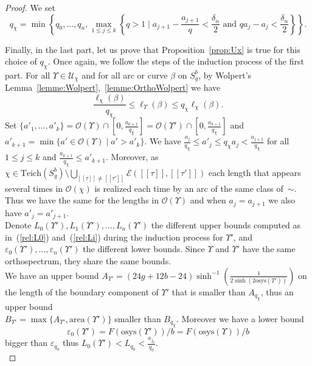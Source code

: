 \documentclass[a4paper,12pt]{article}
\theoremstyle{definition}
\theoremstyle{remark}
\begin{document}
\begin{proof}
    We set 
    \[
        q_\chi=\min \left\{q_0,...,q_n,\max_{1\leqslant j \leqslant k}\left\{q>1 \mid a_{j+1}-\frac{a_{j+1}}{q}< \frac{\delta_n}{2} \mbox{ and } qa_j - a_j < \frac{\delta_n}{2}  \right\} \right\}.
    \] 
    
    Finally, in the last part, let us prove that Proposition~\ref{prop:Ux} is true for this choice of $q_\chi$. Once again, we follow the steps of the induction process of the first part. For all $\Upsilon \in \mathcal{U}_\chi$ and for all arc or curve $\beta$ on $S_g^b$, by Wolpert's Lemma~\ref{lemme:Wolpert},~\ref{lemme:OrthoWolpert} we have
    \[
        \frac{\ell_\chi(\beta)}{q_\chi} \leqslant \ell_\Upsilon(\beta) \leqslant q_\chi \ell_\chi(\beta).    
    \]
    Set $\{a'_1,...,a'_k\}=\mathcal{O}(\Upsilon)\cap [0,\frac{a_{k+1}}{q_\chi}]=\mathcal{O}(\Upsilon')\cap [0,\frac{a_{k+1}}{q_\chi}]$ and $a'_{k+1}=\min\{ a' \in \mathcal{O}(\Upsilon) \mid a' > a'_k \}$. 
    We have $\frac{a_j}{q_\chi} \leqslant a'_j \leqslant q_\chi a_j < \frac{a_{j+1}}{q_\chi}$ for all $1 \leqslant j \leqslant k$ and $\frac{a_{k+1}}{q_\chi} \leqslant a'_{k+1}$. Moreover, as $\chi \in \mathrm{Teich}(S_g^b) \setminus \bigcup_{[[\tau]]\neq [[\tau']]} \mathcal{E}([[\tau]],[[\tau']])$ each length that appears several times in $\mathcal{O}(\chi)$ is realized each time by an arc of the same class of~$\sim$. Thus we have the same for the lengths in $\mathcal{O}(\Upsilon)$ and when $a_j=a_{j+1}$ we also have $a'_j=a'_{j+1}$.\\
    
    Denote $L_{0}(\Upsilon'), L_{1}(\Upsilon'),...,L_{n}(\Upsilon')$ the different upper bounds computed as in~(\ref{rel:L0}) and~(\ref{rel:Li}) during the induction process for $\Upsilon'$, and $\varepsilon_{0}(\Upsilon'),...,\varepsilon_{n}(\Upsilon')$ the different lower bounds. Since $\Upsilon$ and $\Upsilon'$ have the same orthospectrum, they share the same bounds. \\
    We have an upper bound $A_{\Upsilon'} = (24g+12b-24) \sinh^{-1}\left( \frac{1}{2\sinh(2 \mathrm{osys}(\Upsilon'))} \right)$ on the length of the boundary component of $\Upsilon'$ that is smaller than $A_{q_\chi}$, thus an upper bound \\
    $B_{\Upsilon'}=\max\{ A_{\Upsilon'}, \mathrm{area}(\Upsilon')\}$ smaller than $B_{q_\chi}$. Moreover we have a lower bound
    \[
        \varepsilon_{0}(\Upsilon')=F(\mathrm{osys}(\Upsilon'))/b=F(\mathrm{osys}(\Upsilon))/b
    \]
    bigger than $\varepsilon_{q_0}$ thus $L_{0}(\Upsilon') < L_{q_0} < \frac{a_{j_0}}{q_0}$.\\
    

\end{proof}
\end{document}
